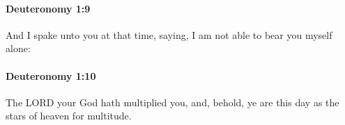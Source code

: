 		\paragraph{Deuteronomy 1:9} %
			\label{DEUTERONOMY-1-9}

			And I spake unto you at that time, saying, I am not able to bear you myself alone:


		\paragraph{Deuteronomy 1:10} %
			\label{DEUTERONOMY-1-10}

			The LORD your God hath multiplied you, and, behold, ye are this day as the stars of heaven for multitude.


